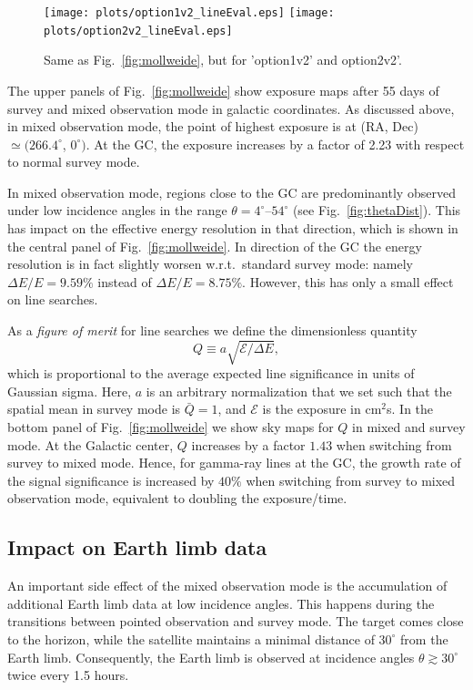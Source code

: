 \documentclass[aps,prd,superscriptaddress,showpacs,nofootinbib,fixlfloat, 12pt]{revtex4-1}
\begin{document}
\begin{figure}[t]
  \begin{center}
    \texttt{[image: plots/option1v2\_lineEval.eps]}
    \texttt{[image: plots/option2v2\_lineEval.eps]}
    \vspace{-0.5cm}
  \end{center}
  \caption{Same as Fig.~\ref{fig:mollweide}, but for 'option1v2' and
  option2v2'.}
  \label{fig:mollweide2}
\end{figure}

The upper panels of Fig.~\ref{fig:mollweide} show exposure maps after 55 days
of survey and mixed observation mode in galactic coordinates. As discussed
above, in mixed
observation mode, the point of highest exposure is at (RA,
Dec)$\simeq(266.4^\circ$, $0^\circ)$. At the GC, the exposure
increases by a factor of 2.23 with respect to normal survey mode.

In mixed observation mode, regions close to the GC are predominantly observed
under low incidence angles in the range $\theta=4^\circ$--$54^\circ$ (see
Fig.~\ref{fig:thetaDist}). This has impact on the effective energy resolution
in that direction, which is shown in the central panel of
Fig.~\ref{fig:mollweide}. In direction of the GC the energy resolution is in
fact slightly worsen w.r.t.~standard survey mode: namely $\Delta E/E=9.59\%$
instead of $\Delta E/E=8.75\%$. However, this has only a small effect on line
searches.

As a \emph{figure of merit} for line searches we define the dimensionless
quantity 
$$Q\equiv a\sqrt{\mathcal{E}/\Delta E},$$
 which is proportional to the
average expected line significance in units of Gaussian sigma. Here, $a$ is an
arbitrary normalization that we set such that the spatial mean in survey mode
is $\bar Q=1$, and $\mathcal{E}$ is the exposure in cm$^2$s. In the bottom panel of Fig.~\ref{fig:mollweide} we show sky
maps for $Q$ in mixed and survey mode. At the Galactic center, $Q$ increases
by a factor $1.43$ when switching from survey to mixed mode. Hence, for
gamma-ray lines at the GC, the growth rate of the signal significance is
increased by $40\%$ when switching from survey to mixed observation mode,
equivalent to doubling the exposure/time. 

\subsection{Impact on Earth limb data}
An important side effect of the mixed observation mode is the accumulation of
additional Earth limb data at low incidence angles. This happens during the
transitions between pointed observation and survey mode. The target comes
close to the horizon, while the satellite maintains a minimal distance of
$30^\circ$ from the Earth limb. Consequently, the Earth limb is observed at
incidence angles $\theta\gtrsim30^\circ$ twice every 1.5 hours.
\end{document}
